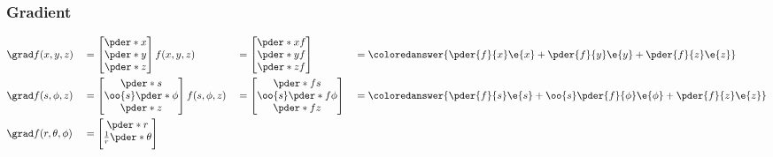        \subsubsection*{Gradient}
            \begin{align*}
                &\grad f(x,y,z)
                &&= 
                \begin{bmatrix}
                    \pder*{x}
                    \\
                    \pder*{y}
                    \\
                    \pder*{z}
                \end{bmatrix}
                f(x,y,z)
                &&= 
                \begin{bmatrix}
                    \pder*{x}f
                    \\
                    \pder*{y}f
                    \\
                    \pder*{z}f
                \end{bmatrix}
                &&= 
                \coloredanswer{\pder{f}{x}\e{x}+\pder{f}{y}\e{y}+\pder{f}{z}\e{z}}
            \\
                &\grad f(s,\phi,z) 
                &&= 
                \begin{bmatrix}
                    \pder*{s}\\
                    \oo{s} \pder*{\phi}\\
                    \pder*{z}\\
                \end{bmatrix}
                f(s,\phi,z)
                &&=
                \begin{bmatrix}
                    \pder*{f}{s}\\
                    \oo{s} \pder*{f}{\phi}\\
                    \pder*{f}{z}\\
                \end{bmatrix}
                &&=\coloredanswer{\pder{f}{s}\e{s}+\oo{s} \pder{f}{\phi}\e{\phi}+\pder{f}{z}\e{z}}
            \\
                &\grad f(r,\theta,\phi) 
                &&= 
                \begin{bmatrix}
                    \pder*{r}
                    \\
                    \frac{1}{r} \pder*{\theta}
                    \\[5pt]

\end{bmatrix}
\end{align*}
